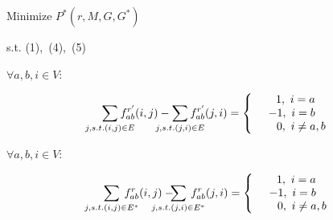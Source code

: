 \documentclass[conference]{IEEEtran}
\begin{document}
\begin{center}
Minimize \quad $P^*(r, M, G, G^*)$
\end{center}

\begin{center}
s.t. (1),\ (4),\ (5)
\end{center}

\begin{center}
    $\forall a,b,i \in V$: \quad \quad \quad \quad \quad \quad \quad \quad \quad \quad \quad \quad \quad \quad \quad
    \vspace{-0.3in}
\end{center}

\begin{equation}
\label{equation_flow_for_routing_second}
    \begin{split}
    \sum_{j, s.t.(i,j) \in E}\hspace{-0.2in}f^{r'}_{ab}(i,j) - \hspace{-0.2in}\sum_{j, s.t.(j,i) \in E}\hspace{-0.2in}f^{r'}_{ab}(j,i) =
    \left\{
        \begin{array}{c}
        \ \ 1, \ i = a \\
        -1, \ i = b \\
        \ \ \ \ \ 0, \ i \neq a,b \\
        \end{array}
    \right.
    \end{split}
\end{equation}

\begin{center}
    \vspace{0.1in}
    $\forall a,b,i \in V$: \quad \quad \quad \quad \quad \quad \quad \quad \quad \quad \quad \quad \quad \quad \quad
    \vspace{-0.3in}
\end{center}

\begin{equation}
\label{equation_flow_for_routing}
    \begin{split}
    \sum_{j, s.t.(i,j) \in E^*}\hspace{-0.2in}f^r_{ab}(i,j) - \hspace{-0.3in}\sum_{j, s.t.(j,i) \in E^*}\hspace{-0.2in}f^r_{ab}(j,i) =
    \left\{
        \begin{array}{c}
        \ \ 1, \ i = a \\
        -1, \ i = b \\
        \ \ \ \ \ 0, \ i \neq a,b \\
        \end{array}
    \right.
    \end{split}
\end{equation}
\end{document}
